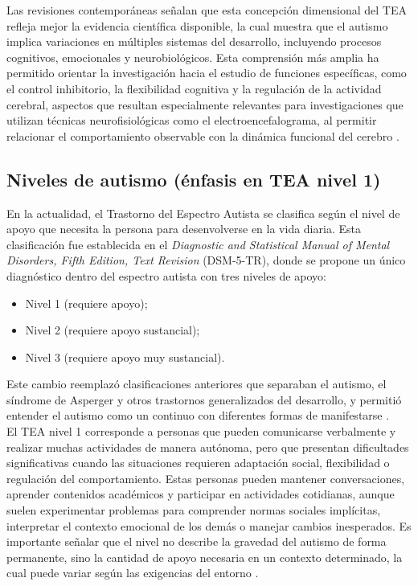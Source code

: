\documentclass{book}
\begin{document}
Las revisiones contemporáneas señalan que esta concepción dimensional del TEA refleja mejor la evidencia científica disponible, la cual muestra que el autismo implica variaciones en múltiples sistemas del desarrollo, incluyendo procesos cognitivos, emocionales y neurobiológicos. Esta comprensión más amplia ha permitido orientar la investigación hacia el estudio de funciones específicas, como el control inhibitorio, la flexibilidad cognitiva y la regulación de la actividad cerebral, aspectos que resultan especialmente relevantes para investigaciones que utilizan técnicas neurofisiológicas como el electroencefalograma, al permitir relacionar el comportamiento observable con la dinámica funcional del cerebro \cite{Happe2020, Lord2018, Hirota2023}.

\subsection{Niveles de autismo (énfasis en TEA nivel 1)}

En la actualidad, el Trastorno del Espectro Autista se clasifica según el nivel de apoyo que necesita la persona para desenvolverse en la vida diaria. Esta clasificación fue establecida en el \textit{Diagnostic and Statistical Manual of Mental Disorders, Fifth Edition, Text Revision} (DSM-5-TR), donde se propone un único diagnóstico dentro del espectro autista con tres niveles de apoyo:
\begin{itemize}
    \item Nivel 1 (requiere apoyo);
    \item Nivel 2 (requiere apoyo sustancial);
    \item Nivel 3 (requiere apoyo muy sustancial).
\end{itemize}
Este cambio reemplazó clasificaciones anteriores que separaban el autismo, el síndrome de Asperger y otros trastornos generalizados del desarrollo, y permitió entender el autismo como un continuo con diferentes formas de manifestarse \cite{APA2022, Lord2018}.\\

El TEA nivel 1 corresponde a personas que pueden comunicarse verbalmente y realizar muchas actividades de manera autónoma, pero que presentan dificultades significativas cuando las situaciones requieren adaptación social, flexibilidad o regulación del comportamiento. Estas personas pueden mantener conversaciones, aprender contenidos académicos y participar en actividades cotidianas, aunque suelen experimentar problemas para comprender normas sociales implícitas, interpretar el contexto emocional de los demás o manejar cambios inesperados. Es importante señalar que el nivel no describe la gravedad del autismo de forma permanente, sino la cantidad de apoyo necesaria en un contexto determinado, la cual puede variar según las exigencias del entorno \cite{APA2022, Happe2020}.
\end{document}
